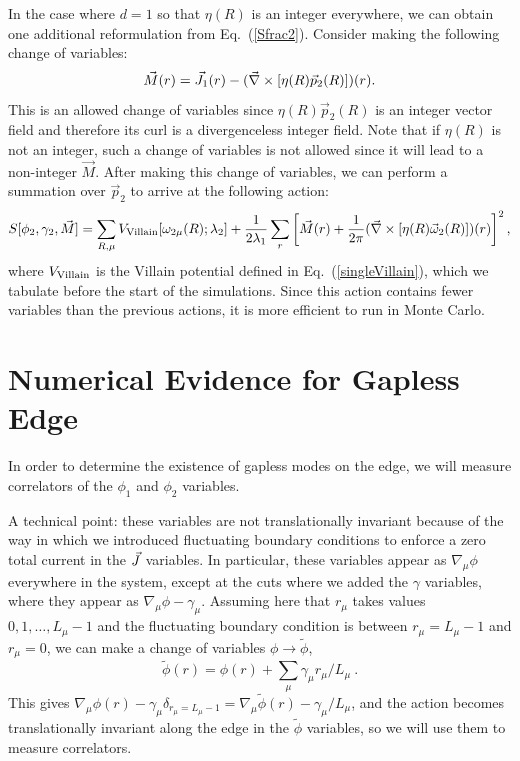 In the case where $d=1$ so that $\eta(R)$ is an integer everywhere, we can obtain one additional reformulation from Eq.~(\ref{Sfrac2}). Consider making the following change of variables:
\begin{equation}
\vec{M}(r)=\vec{J}_1(r)-(\vec{\nabla}\times[\eta(R)\vec{p}_2(R)])(r).
\end{equation}
This is an allowed change of variables since $\eta(R)\vec{p}_2(R)$ is an integer vector field and therefore its curl is a divergenceless integer field.
Note that if $\eta(R)$ is not an integer, such a change of variables is not allowed since it will lead to a non-integer $\vec{M}$. After making this change of variables, we can perform a summation over $\vec{p}_2$ to arrive at the following action:
\begin{eqnarray}
 S[\phi_2,\gamma_2,\vec{M}]=
\sum_{R,\mu} V_{\rm Villain}[\omega_{2\mu}(R);\lambda_2] 
\label{Sint}
 +\frac{1}{2\lambda_1}\sum_r\left[\vec{M}(r)+\frac{1}{2\pi}(\vec{\nabla}\times[\eta(R)\vec{\omega}_{2}(R)])(r)\right]^2,
\end{eqnarray}
where $V_{\rm Villain}$ is the Villain potential defined in Eq.~(\ref{singleVillain}), which we tabulate before the start of the simulations.  Since this action contains fewer variables than the previous actions, it is more efficient to run in Monte Carlo. 

\section{Numerical Evidence for Gapless Edge}
\label{sec::results}
In order to determine the existence of gapless modes on the edge, we will measure correlators of the $\phi_1$ and $\phi_2$ variables. 

A technical point: 
these variables are not translationally invariant because of the way in which we introduced fluctuating boundary conditions to enforce a zero total current in the $\vec{J}$ variables. In particular,  these variables appear as $\nabla_\mu\phi$ everywhere in the system, except at the cuts where we added the $\gamma$ variables, where they appear as $\nabla_\mu\phi-\gamma_\mu$. 
Assuming here that $r_\mu$ takes values $0, 1, \dots, L_\mu-1$ and the fluctuating boundary condition is between $r_\mu = L_\mu-1$ and $r_\mu = 0$, we can make a change of variables $\phi \rightarrow \tilde{\phi}$, 
\begin{equation}
\tilde{\phi}(r) = \phi(r) + \sum_\mu \gamma_\mu r_\mu/L_\mu ~.
\end{equation}
This gives $\nabla_\mu \phi(r) - \gamma_\mu \delta_{r_\mu = L_\mu-1} = 
\nabla_\mu \tilde{\phi}(r) - \gamma_\mu/L_\mu$, and the action becomes translationally invariant along the edge in the $\tilde{\phi}$ variables, so we will use them to measure correlators.

